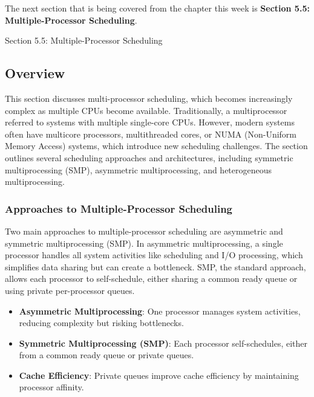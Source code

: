 The next section that is being covered from the chapter this week is \textbf{Section 5.5: Multiple-Processor Scheduling}.

\begin{notes}{Section 5.5: Multiple-Processor Scheduling}
    \subsection*{Overview}

    This section discusses multi-processor scheduling, which becomes increasingly complex as multiple CPUs become available. Traditionally, a multiprocessor referred to systems with multiple single-core CPUs. 
    However, modern systems often have multicore processors, multithreaded cores, or NUMA (Non-Uniform Memory Access) systems, which introduce new scheduling challenges. The section outlines several scheduling 
    approaches and architectures, including symmetric multiprocessing (SMP), asymmetric multiprocessing, and heterogeneous multiprocessing.
    
    \subsubsection*{Approaches to Multiple-Processor Scheduling}
    
    Two main approaches to multiple-processor scheduling are asymmetric and symmetric multiprocessing (SMP). In asymmetric multiprocessing, a single processor handles all system activities like scheduling 
    and I/O processing, which simplifies data sharing but can create a bottleneck. SMP, the standard approach, allows each processor to self-schedule, either sharing a common ready queue or using private 
    per-processor queues.
    
    \begin{highlight}
    
        \begin{itemize}
            \item \textbf{Asymmetric Multiprocessing}: One processor manages system activities, reducing complexity but risking bottlenecks.
            \item \textbf{Symmetric Multiprocessing (SMP)}: Each processor self-schedules, either from a common ready queue or private queues.
            \item \textbf{Cache Efficiency}: Private queues improve cache efficiency by maintaining processor affinity.
        \end{itemize}
    

\end{highlight}
\end{notes}

